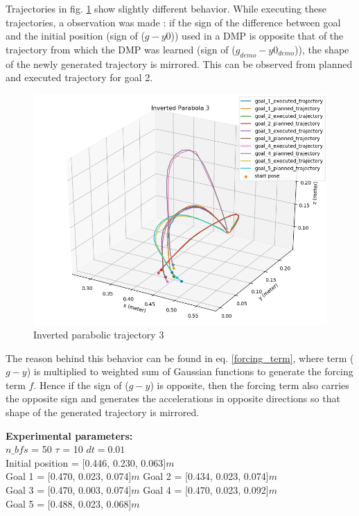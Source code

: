 Trajectories in fig. \ref{fig:inv_par_3} show slightly different behavior. While executing these trajectories, a observation was made : if the sign of the difference between goal and the initial position (sign of ($g - y0$)) used in a DMP is opposite that of the trajectory from which the DMP was learned (sign of ($g_{demo} - y0_{demo}$)), the shape of the newly generated trajectory is mirrored. This can be observed from planned and executed trajectory for goal 2. 


\begin{figure}[H]
	\centering
	\includegraphics[scale=0.6]{images/1/inv_par_3.png}
	\caption{Inverted parabolic trajectory 3}
	\label{fig:inv_par_3}
\end{figure}

The reason behind this behavior can be found in eq. \ref{forcing_term}, where term ($g - y$) is multiplied to weighted sum of Gaussian functions to generate the forcing term $f$. Hence if the sign of ($g - y$) is opposite, then the forcing term also carries the opposite sign and generates the accelerations in opposite directions so that shape of the generated trajectory is mirrored. 

\textbf{Experimental parameters:} \\
$n\_bfs$ = 50 \hspace{3cm}
$\tau$ = 10 \hspace{3cm}
$dt = 0.01$\\
Initial position = [0.446, 0.230, 0.063]$m$ \\
Goal 1 = [0.470, 0.023, 0.074]$m$ \hspace{2cm}
Goal 2 = [0.434, 0.023, 0.074]$m$ \\
Goal 3 = [0.470, 0.003, 0.074]$m$ \hspace{2cm}
Goal 4 = [0.470, 0.023, 0.092]$m$ \\
Goal 5 = [0.488, 0.023, 0.068]$m$


